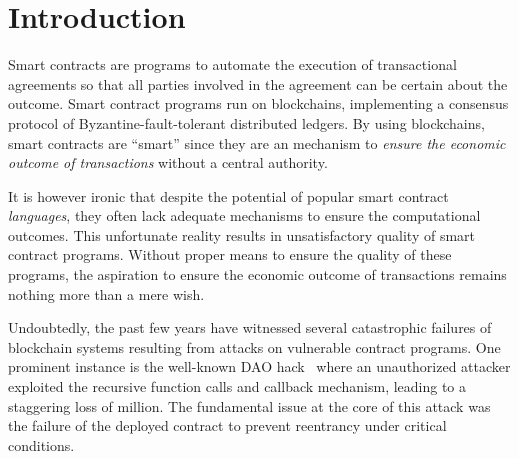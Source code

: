\section{Introduction} \label{sec:intro}





Smart contracts are programs to automate the execution of transactional agreements so that all
parties involved in the agreement can be certain about the outcome.
Smart contract programs run on blockchains, implementing a consensus
protocol of Byzantine-fault-tolerant distributed ledgers.
By using blockchains, smart contracts are ``smart'' since they are an
mechanism to \emph{ensure the economic outcome of transactions} without a
central authority.

It is however ironic that despite the potential of popular smart contract
\emph{languages}, they often lack adequate mechanisms to ensure the
computational outcomes.  This unfortunate reality results in unsatisfactory
quality of smart contract programs. Without proper means to ensure the quality
of these programs, the aspiration to ensure the economic outcome of
transactions remains nothing more than a mere wish.

Undoubtedly, the past few years have witnessed several catastrophic failures
of blockchain systems resulting from attacks on vulnerable contract programs.
One prominent instance is the well-known DAO hack~\cite{DAOhack} where an unauthorized
attacker exploited the recursive function calls and callback mechanism, leading
to a staggering loss of  million. The fundamental issue at the core of this
attack was the failure of the deployed contract to prevent reentrancy under
critical conditions.

